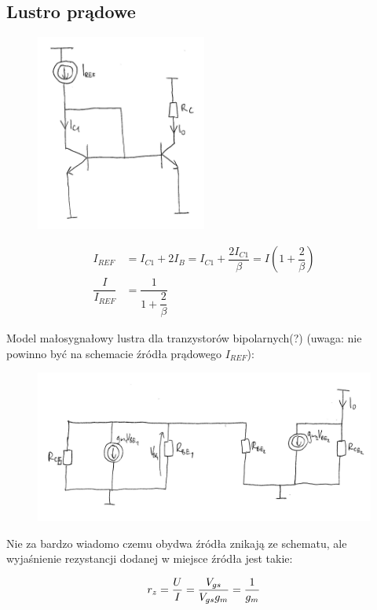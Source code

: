 \documentclass[10pt,a4paper]{article}
\begin{document}
\subsection{Lustro prądowe}
\begin{figure}[H]
\centering
\includegraphics[width=0.5\textwidth]{lustro}
\end{figure}
\begin{align*}
I_{REF}&=I_{C1}+2I_B=I_{C1}+\dfrac{2I_{C1}}{\beta}=I(1+\dfrac{2}{\beta}) \\
\dfrac{I}{I_{REF}}&=\dfrac{1}{1+\dfrac{2}{\beta}}
\end{align*}

Model małosygnałowy lustra dla tranzystorów bipolarnych(?) (uwaga: nie powinno być na schemacie źródła prądowego $I_{REF}$):
\begin{figure}[H]
\centering
\includegraphics[scale=0.8]{lustr_wyp1}
\end{figure}

Nie za bardzo wiadomo czemu obydwa źródła znikają ze schematu, ale wyjaśnienie rezystancji dodanej w miejsce źródła jest takie:

\begin{equation}
r_z = {U \over I} = {V_{gs} \over V_{gs}g_m} = {1 \over g_m}
\end{equation}
\end{document}
